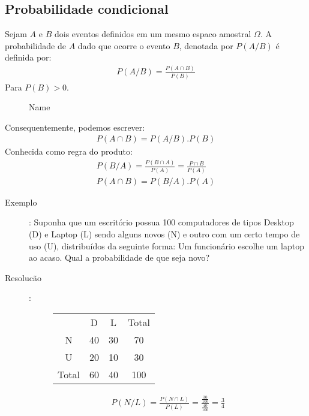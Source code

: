 \documentclass[11pt,a4paper]{book}
\begin{document}
\begin{description}
    \subsection{Probabilidade condicional}
    Sejam $A$ e $B$ dois eventos definidos em um mesmo espaco amostral $\Omega$.
    A probabilidade de $A$  dado que ocorre o evento $B$, denotada por $P(A/B)$ é definida por:
    \begin{align}
      P(A/B)= \frac{P(A\cap B)}{P(B)}
    \end{align}
    Para $P(B)>0$. 
    \begin{figure}[htpb]
      \centering
      \caption{Name}
      \label{fig:16}
    \end{figure}
    Consequentemente, podemos escrever:
    \begin{align}
      P(A\cap B)= P(A/B).P(B)
    \end{align}
    Conhecida como regra do produto:
    \begin{align}
      P(B/A)= \frac{P(B \cap A)}{P(A)}= \frac{P\cap B}{P(A)}\\
      P(A \cap B)= P(B/A).P(A)
    \end{align}
    \begin{description}
      \item [Exemplo]: Suponha que um escritório possua 100 computadores de tipos Desktop (D) e 
        Laptop (L) sendo alguns novos (N) e outro com um certo tempo de uso (U), distribuídos da seguinte forma:
        Um funcionário escolhe um laptop ao acaso. Qual a probabilidade de que seja novo?

      \item[Resolucão]: 
        \begin{figure}[H] 
          \centering
          \begin{tabular}{c c c c}
            \toprule
            &D&L&Total\\ \cmidrule{2-4}
            N&40&30&70\\ \cmidrule{2-4}
            U&20&10&30\\ \cmidrule{2-4}
            Total&60&40&100 \\\bottomrule
          \end{tabular}
          \label{tab:2}
        \end{figure}


        \begin{align*}
          P(N/L)= \frac{P(N \cap L)}{P(L)}= \frac{\frac{30}{100}}{\frac{40}{100}}=\frac{3}{4}
        \end{align*}


\end{description}
\end{description}
\end{document}
